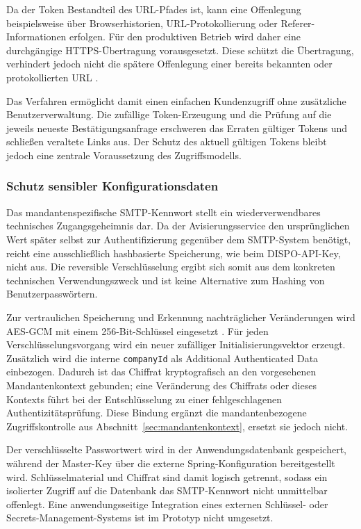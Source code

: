 \documentclass[
  12pt,
  a4paper,
  oneside
]{article}
\begin{document}
Da der Token Bestandteil des URL-Pfades ist, kann eine Offenlegung
beispielsweise über Browserhistorien, URL-Protokollierung oder
Referer-Informationen erfolgen. Für den produktiven Betrieb wird daher eine
durchgängige HTTPS-Übertragung vorausgesetzt. Diese schützt die Übertragung,
verhindert jedoch nicht die spätere Offenlegung einer bereits bekannten oder
protokollierten URL \parencite{owaspInformationExposureUrls}.

Das Verfahren ermöglicht damit einen einfachen Kundenzugriff ohne zusätzliche
Benutzerverwaltung. Die zufällige Token-Erzeugung und die Prüfung auf die
jeweils neueste Bestätigungsanfrage erschweren das Erraten gültiger Tokens
und schließen veraltete Links aus. Der Schutz des aktuell gültigen Tokens
bleibt jedoch eine zentrale Voraussetzung des Zugriffsmodells.

\subsubsection{Schutz sensibler Konfigurationsdaten}
\label{sec:konfigurationsschutz}

Das mandantenspezifische SMTP-Kennwort stellt ein wiederverwendbares
technisches Zugangsgeheimnis dar. Da der Avisierungsservice den ursprünglichen
Wert später selbst zur Authentifizierung gegenüber dem SMTP-System benötigt,
reicht eine ausschließlich hashbasierte Speicherung, wie beim DISPO-API-Key,
nicht aus. Die reversible Verschlüsselung ergibt sich somit aus dem konkreten
technischen Verwendungszweck und ist keine Alternative zum Hashing von
Benutzerpasswörtern.

Zur vertraulichen Speicherung und Erkennung nachträglicher Veränderungen wird
AES-GCM mit einem 256-Bit-Schlüssel eingesetzt
\parencite{dworkin2007gcm,nist2023aes}. Für jeden Verschlüsselungsvorgang wird
ein neuer zufälliger
Initialisierungsvektor erzeugt. Zusätzlich wird die interne
\texttt{companyId} als Additional Authenticated Data einbezogen. Dadurch ist
das Chiffrat kryptografisch an den vorgesehenen Mandantenkontext gebunden; eine
Veränderung des Chiffrats oder dieses Kontexts führt bei der Entschlüsselung zu
einer fehlgeschlagenen Authentizitätsprüfung. Diese Bindung ergänzt die
mandantenbezogene Zugriffskontrolle aus
Abschnitt~\ref{sec:mandantenkontext}, ersetzt sie jedoch nicht.

Der verschlüsselte Passwortwert wird in der Anwendungsdatenbank gespeichert,
während der Master-Key über die externe Spring-Konfiguration bereitgestellt
wird. Schlüsselmaterial und Chiffrat sind damit logisch getrennt, sodass ein
isolierter Zugriff auf die Datenbank das SMTP-Kennwort nicht unmittelbar
offenlegt. Eine anwendungsseitige Integration eines externen Schlüssel- oder
Secrets-Management-Systems ist im Prototyp nicht umgesetzt.
\end{document}
